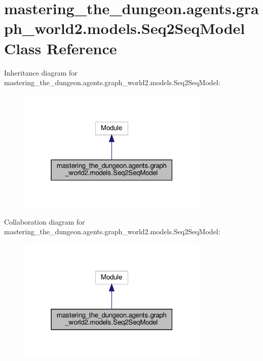 \hypertarget{classmastering__the__dungeon_1_1agents_1_1graph__world2_1_1models_1_1Seq2SeqModel}{}\section{mastering\+\_\+the\+\_\+dungeon.\+agents.\+graph\+\_\+world2.\+models.\+Seq2\+Seq\+Model Class Reference}
\label{classmastering__the__dungeon_1_1agents_1_1graph__world2_1_1models_1_1Seq2SeqModel}


Inheritance diagram for mastering\+\_\+the\+\_\+dungeon.\+agents.\+graph\+\_\+world2.\+models.\+Seq2\+Seq\+Model\+:
\nopagebreak
\begin{figure}[H]
\begin{center}
\leavevmode
\includegraphics[width=259pt]{classmastering__the__dungeon_1_1agents_1_1graph__world2_1_1models_1_1Seq2SeqModel__inherit__graph}
\end{center}
\end{figure}


Collaboration diagram for mastering\+\_\+the\+\_\+dungeon.\+agents.\+graph\+\_\+world2.\+models.\+Seq2\+Seq\+Model\+:
\nopagebreak
\begin{figure}[H]
\begin{center}
\leavevmode
\includegraphics[width=259pt]{classmastering__the__dungeon_1_1agents_1_1graph__world2_1_1models_1_1Seq2SeqModel__coll__graph}
\end{center}
\end{figure}
